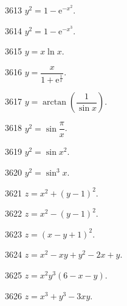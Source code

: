 
\begin{prob}[S]{3613}
$y^2 = 1 - \mathrm{e}^{-x^2}$.
\end{prob}

\begin{prob}[S]{3614}
$y^2 = 1 - \mathrm{e}^{-x^3}$.
\end{prob}

\begin{prob}[S]{3615}
$y = x\ln x$.
\end{prob}

\begin{prob}[S]{3616}
$y = \dfrac{x}{1 + \mathrm{e}^{\frac{1}{x}}}$.
\end{prob}

\begin{prob}[S]{3617}
$y = \arctan\left(\dfrac{1}{\sin x}\right)$.
\end{prob}

\begin{prob}[S]{3618}
$y^2 = \sin\dfrac{\pi}{x}$.
\end{prob}

\begin{prob}[S]{3619}
$y^2 = \sin x^2$.
\end{prob}

\begin{prob}[S]{3620}
$y^2 = \sin^3 x$.
\end{prob}



\begin{prob}[S]{3621}
$z = x^2 + (y - 1)^2$.
\end{prob}

\begin{prob}[S]{3622}
$z = x^2 - (y - 1)^2$.
\end{prob}

\begin{prob}[S]{3623}
$z = (x - y + 1)^2$.
\end{prob}

\begin{prob}[S]{3624}
$z = x^2 - xy + y^2 - 2x + y$.
\end{prob}

\begin{prob}[S]{3625}
$z = x^2 y^3(6 - x - y)$.
\end{prob}

\begin{prob}[S]{3626}
$z = x^3 + y^3 - 3xy$.
\end{prob}

